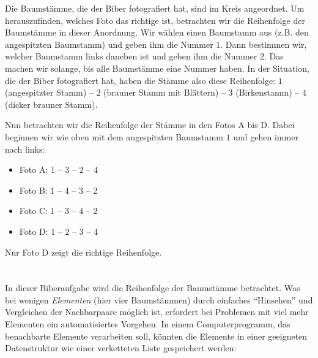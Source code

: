 {{Die Baumstämme, die der Biber fotografiert hat, sind im Kreis angeordnet. Um herauszufinden, welches Foto das richtige ist, betrachten wir die Reihenfolge der Baumstämme in dieser Anordnung. Wir wählen einen Baumstamm aus (z.B. den angespitzten Baumstamm) und geben ihm die Nummer $1$. Dann bestimmen wir, welcher Baumstamm links daneben ist und geben ihm die Nummer $2$. Das machen wir solange, bis alle Baumstämme eine Nummer haben. In der Situation, die der Biber fotografiert hat, haben die Stämme also diese Reihenfolge: $1$ (angespitzter Stamm) – $2$ (brauner Stamm mit Blättern) – $3$ (Birkenstamm) – $4$ (dicker brauner Stamm).

{\centering%
\par}

Nun betrachten wir die Reihenfolge der Stämme in den Fotos A bis D. Dabei beginnen wir wie oben mit dem angespitzten Baumstamm $1$ und gehen immer nach links:

\begin{itemize}
  \item Foto A: $1$ – $3$ – $2$ – 4
  \item Foto B: $1$ – $4$ – $3$ – 2
  \item Foto C: $1$ – $3$ – $4$ – 2
  \item Foto D: $1$ – $2$ – $3$ – 4
\end{itemize}

Nur Foto D zeigt die richtige Reihenfolge.

{\centering%
\par}



\section*{\BrochureItsInformatics}
In dieser Biberaufgabe wird die Reihenfolge der Baumstämme betrachtet. Was bei wenigen \emph{Elementen} (hier vier Baumstämmen) durch einfaches “Hinsehen” und Vergleichen der Nachbarpaare möglich ist, erfordert bei Problemen mit viel mehr Elementen ein automatisiertes Vorgehen. In einem Computerprogramm, das benachbarte Elemente verarbeiten soll, könnten die Elemente in einer geeigneten Datenstruktur wie einer verketteten Liste gespeichert werden:

{\centering%
\par}

}}
